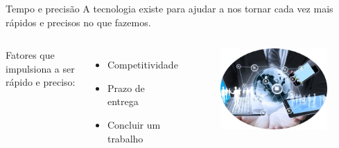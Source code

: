 \begin{frame}{Tempo e precisão}
	A tecnologia existe para ajudar a nos tornar cada vez mais rápidos e precisos no que fazemos. 

	\begin{columns}
		Fatores que impulsiona a ser rápido e preciso:
				\begin{itemize}
					\item Competitividade
					\item Prazo de entrega
					\item Concluir um trabalho 
				\end{itemize}
		\begin{figure}[hb]
			\includegraphics[width=1\textwidth]{figures/servicos.jpg}
		\end{figure}
	\end{columns}
\end{frame}

